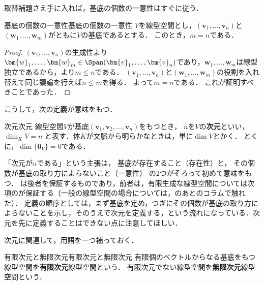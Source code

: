 取替補題さえ手に入れば，基底の個数の一意性はすぐに従う．

\begin{theorem}{基底の個数の一意性}{基底の個数の一意性}
  $V$を線型空間とし，$(\bm{v}_1, \dots, \bm{v}_n)$と$(\bm{w}_1, \dots, \bm{w}_m)$がともに$V$の基底であるとする．
  このとき，$m = n$である．
\end{theorem}

\begin{tleftbar}
\begin{proof}
  $(\bm{v}_1, \dots, \bm{v}_n)$の生成性より$\bm{w}_1, \dots, \bm{w}_m \in \Span(\bm{v}_1, \dots, \bm{v}_n)$であり，$\bm{w}_1, \dots, \bm{w}_m$は線型独立であるから，より$m \le n$である．
  $(\bm{v}_1, \dots, \bm{v}_n)$と$(\bm{w}_1, \dots, \bm{w}_m)$の役割を入れ替えて同じ議論を行えば$n \le m$を得る．
  よって$m = n$である．
  これが証明すべきことであった．
\end{proof}
\end{tleftbar}

こうして，次の定義が意味をもつ．

\begin{definition}{次元}{次元}
  線型空間$V$が基底$(\bm{v}_1, \bm{v}_2, \dots, \bm{v}_n)$をもつとき，
  $n$を$V$の\textbf{次元}といい，
  $\dim_K V = n$
  と表す．体$K$が文脈から明らかなときは，単に$\dim V$とかく．
  とくに，$\dim \{\bm{0}_V\} = 0$である．
\end{definition}

\begin{remark}[「次元」が意味をもつために]
  「次元が$n$である」という主張は，
  基底が存在すること（存在性）と，
  その個数が基底の取り方によらないこと（一意性）
  の$2$つがそろって初めて意味をもつ．
  は後者を保証するものであり，前者は，有限生成な線型空間については次項のが保証する（一般の線型空間の場合については，のあとのコラムで触れた）．
  定義の順序としては，まず基底を定め，つぎにその個数が基底の取り方によらないことを示し，そのうえで次元を定義する，という流れになっている．次元を先に定義することはできない点に注意してほしい．
\end{remark}

次元に関連して，用語を一つ補っておく．

\begin{definition}{有限次元と無限次元}{有限次元と無限次元}
  有限個のベクトルからなる基底をもつ線型空間を\textbf{有限次元}線型空間という．
  有限次元でない線型空間を\textbf{無限次元}線型空間という．
\end{definition}

